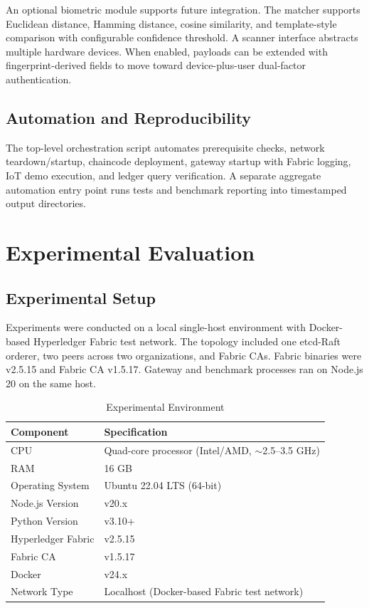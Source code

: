 \documentclass[conference]{IEEEtran}
\begin{document}
An optional biometric module supports future integration. The matcher supports Euclidean distance, Hamming distance, cosine similarity, and template-style comparison with configurable confidence threshold. A scanner interface abstracts multiple hardware devices. When enabled, payloads can be extended with fingerprint-derived fields to move toward device-plus-user dual-factor authentication.

\subsection{Automation and Reproducibility}

The top-level orchestration script automates prerequisite checks, network teardown/startup, chaincode deployment, gateway startup with Fabric logging, IoT demo execution, and ledger query verification. A separate aggregate automation entry point runs tests and benchmark reporting into timestamped output directories.

\section{Experimental Evaluation}
\label{sec:eval}

\subsection{Experimental Setup}

Experiments were conducted on a local single-host environment with Docker-based Hyperledger Fabric test network. The topology included one etcd-Raft orderer, two peers across two organizations, and Fabric CAs. Fabric binaries were v2.5.15 and Fabric CA v1.5.17. Gateway and benchmark processes ran on Node.js 20 on the same host.

\begin{table}[htbp]
\caption{Experimental Environment}
\label{tab:exp_setup}
\centering
\footnotesize
\setlength{\tabcolsep}{4pt}
\begin{tabular}{ll}
\toprule
\textbf{Component} & \textbf{Specification} \\
\midrule
CPU                     & Quad-core processor (Intel/AMD, $\sim$2.5--3.5 GHz) \\
RAM                     & 16 GB \\
Operating System        & Ubuntu 22.04 LTS (64-bit) \\
Node.js Version         & v20.x \\
Python Version          & v3.10+ \\
Hyperledger Fabric      & v2.5.15 \\
Fabric CA               & v1.5.17 \\
Docker                  & v24.x \\
Network Type            & Localhost (Docker-based Fabric test network) \\
\bottomrule
\end{tabular}
\end{table}
\end{document}
